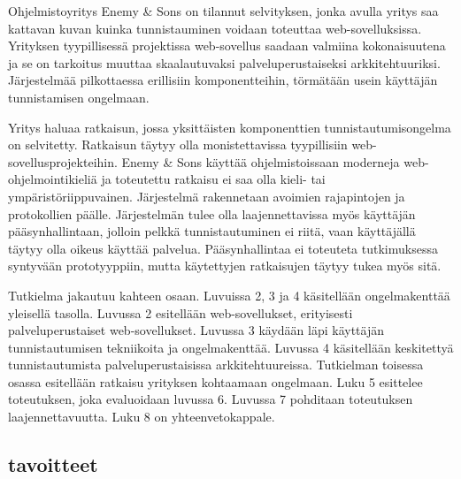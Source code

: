 Ohjelmistoyritys Enemy \& Sons on tilannut selvityksen, jonka avulla yritys saa kattavan kuvan kuinka tunnistauminen voidaan toteuttaa web-sovelluksissa. Yrityksen tyypillisessä projektissa web-sovellus saadaan valmiina kokonaisuutena ja se on tarkoitus muuttaa skaalautuvaksi palveluperustaiseksi arkkitehtuuriksi. Järjestelmää pilkottaessa erillisiin komponentteihin, törmätään usein käyttäjän tunnistamisen ongelmaan.

Yritys haluaa ratkaisun, jossa yksittäisten komponenttien tunnistautumisongelma on selvitetty. Ratkaisun täytyy olla monistettavissa tyypillisiin web-sovellusprojekteihin. Enemy \& Sons käyttää ohjelmistoissaan moderneja web-ohjelmointikieliä ja toteutettu ratkaisu ei saa olla kieli- tai ympäristöriippuvainen. Järjestelmä rakennetaan avoimien rajapintojen ja protokollien päälle. Järjestelmän tulee olla laajennettavissa myös käyttäjän pääsynhallintaan, jolloin pelkkä tunnistautuminen ei riitä, vaan käyttäjällä täytyy olla oikeus käyttää palvelua. Pääsynhallintaa ei toteuteta tutkimuksessa syntyvään prototyyppiin, mutta käytettyjen ratkaisujen täytyy tukea myös sitä.

Tutkielma jakautuu kahteen osaan. Luvuissa 2, 3 ja 4 käsitellään ongelmakenttää yleisellä tasolla. Luvussa 2 esitellään web-sovellukset, erityisesti palveluperustaiset web-sovellukset. Luvussa 3 käydään läpi käyttäjän tunnistautumisen tekniikoita ja ongelmakenttää. Luvussa 4 käsitellään keskitettyä tunnistautumista palveluperustaisissa arkkitehtuureissa. Tutkielman toisessa osassa esitellään ratkaisu yrityksen kohtaamaan ongelmaan. Luku 5 esittelee toteutuksen, joka evaluoidaan luvussa 6. Luvussa 7 pohditaan toteutuksen laajennettavuutta. Luku 8 on yhteenvetokappale.


\subsection{tavoitteet}
